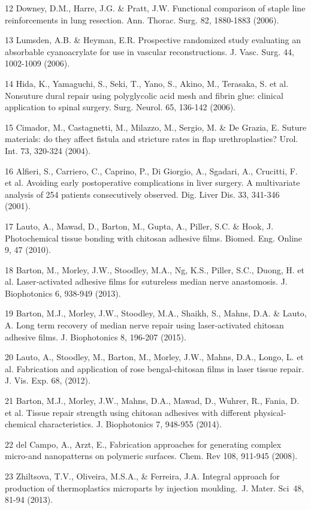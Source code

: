 12	Downey, D.M., Harre, J.G. \& Pratt, J.W. Functional comparison of staple line reinforcements in lung resection. Ann. Thorac. Surg. 82, 1880-1883 (2006). 

13	Lumsden, A.B. \& Heyman, E.R. Prospective randomized study evaluating an absorbable cyanoacrylate for use in vascular reconstructions. J. Vasc. Surg. 44, 1002-1009 (2006). 

14	Hida, K., Yamaguchi, S., Seki, T., Yano, S., Akino, M., Terasaka, S. et al. Nonsuture dural repair using polyglycolic acid mesh and fibrin glue: clinical application to spinal surgery. Surg. Neurol. 65, 136-142 (2006). 

15	Cimador, M., Castagnetti, M., Milazzo, M., Sergio, M. \& De Grazia, E. Suture materials: do they affect fistula and stricture rates in flap urethroplasties? Urol. Int. 73, 320-324 (2004).

16	Alfieri, S., Carriero, C., Caprino, P., Di Giorgio, A., Sgadari, A., Crucitti, F. et al. Avoiding early postoperative complications in liver surgery. A multivariate analysis of 254 patients consecutively observed. Dig. Liver Dis. 33, 341-346 (2001). 

17	Lauto, A., Mawad, D., Barton, M., Gupta, A., Piller, S.C. \& Hook, J. Photochemical tissue bonding with chitosan adhesive films. Biomed. Eng. Online 9, 47 (2010).

18	Barton, M., Morley, J.W., Stoodley, M.A., Ng, K.S., Piller, S.C., Duong, H. et al. Laser‐activated adhesive films for sutureless median nerve anastomosis. J. Biophotonics 6, 938-949 (2013). 

19	Barton, M.J., Morley, J.W., Stoodley, M.A., Shaikh, S., Mahns, D.A. \& Lauto, A. Long term recovery of median nerve repair using laser‐activated chitosan adhesive films. J. Biophotonics 8, 196-207 (2015). 

20	Lauto, A., Stoodley, M., Barton, M., Morley, J.W., Mahns, D.A., Longo, L. et al. Fabrication and application of rose bengal-chitosan films in laser tissue repair. J. Vis. Exp. 68, (2012). 

21	Barton, M.J., Morley, J.W., Mahns, D.A., Mawad, D., Wuhrer, R., Fania, D. et al. Tissue repair strength using chitosan adhesives with different physical-chemical characteristics. J. Biophotonics 7, 948-955 (2014).

22	del Campo, A., Arzt, E., Fabrication approaches for generating complex micro-and nanopatterns on polymeric surfaces. Chem. Rev 108, 911-945 (2008).

23	Zhiltsova, T.V., Oliveira, M.S.A., \& Ferreira, J.A. Integral approach for production of thermoplastics microparts by injection moulding. J. Mater. Sci 48, 
81-94 (2013).

